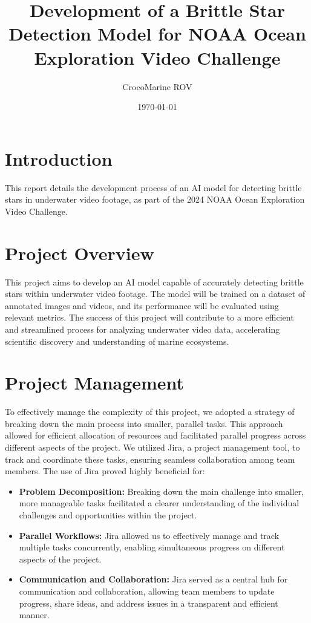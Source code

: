 \documentclass{article}
\title{Development of a Brittle Star Detection Model for NOAA Ocean Exploration Video Challenge}
\author{CrocoMarine ROV}
\date{\today}
\begin{document}
\maketitle

\section{Introduction}

This report details the development process of an AI model for detecting brittle stars in underwater video footage, as part of the 2024 NOAA Ocean Exploration Video Challenge.

\section{Project Overview}

This project aims to develop an AI model capable of accurately detecting brittle stars within underwater video footage. The model will be trained on a dataset of annotated images and videos, and its performance will be evaluated using relevant metrics. The success of this project will contribute to a more efficient and streamlined process for analyzing underwater video data, accelerating scientific discovery and understanding of marine ecosystems.

\section{Project Management}

To effectively manage the complexity of this project, we adopted a strategy of breaking down the main process into smaller, parallel tasks. This approach allowed for efficient allocation of resources and facilitated parallel progress across different aspects of the project. We utilized Jira, a project management tool, to track and coordinate these tasks, ensuring seamless collaboration among team members. The use of Jira proved highly beneficial for:

\begin{itemize}
    \item \textbf{Problem Decomposition:} Breaking down the main challenge into smaller, more manageable tasks facilitated a clearer understanding of the individual challenges and opportunities within the project.
    \item \textbf{Parallel Workflows:} Jira allowed us to effectively manage and track multiple tasks concurrently, enabling simultaneous progress on different aspects of the project.
    \item \textbf{Communication and Collaboration:} Jira served as a central hub for communication and collaboration, allowing team members to update progress, share ideas, and address issues in a transparent and efficient manner.
\end{itemize}
\end{document}
